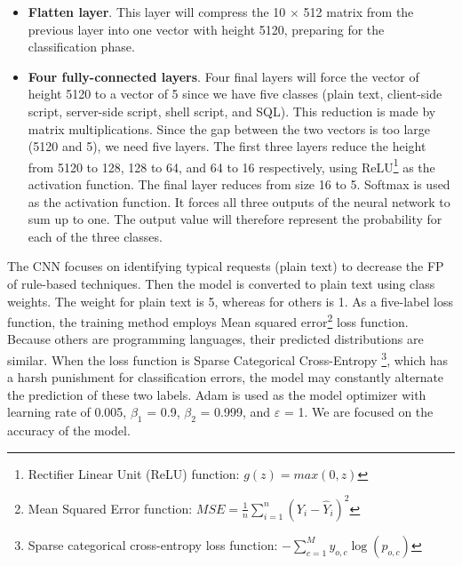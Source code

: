 \begin{itemize}
	\item \textbf{Flatten layer}. This layer will compress the 10 $\times$ 512 matrix from the previous layer into one vector with height 5120, preparing for the classification phase. 
	\item \textbf{Four fully-connected layers}. Four final layers will force the vector of height 5120 to a vector of 5 since we have five classes (plain text, client-side script, server-side script, shell script, and SQL). This reduction is made by matrix multiplications. Since the gap between the two vectors is too large (5120 and 5), we need five layers. The first three layers reduce the height from 5120 to 128, 128 to 64, and 64 to 16 respectively, using ReLU\footnote{
		Rectifier Linear Unit (ReLU) function: $g(z) = max(0, z)$
	} as the activation function. The final layer reduces from size 16 to 5. Softmax is used as the activation function. It forces all three outputs of the neural network to sum up to one. The output value will therefore represent the probability for each of the three classes.
\end{itemize}
\newpage
\hspace{0.5cm}The CNN focuses on identifying typical requests (plain text) to decrease the FP of rule-based techniques. Then the model is converted to plain text using class weights. The weight for plain text is 5, whereas for others is 1. As a five-label loss function, the training method employs Mean squared error\footnote{
	Mean Squared Error function: $MSE = \frac{1}{n}\sum_{i=1}^{n}(Y_i-\widehat{Y}_i)^2$
} loss function. Because others are programming languages, their predicted distributions are similar. When the loss function is Sparse Categorical Cross-Entropy\hspace{-0.15cm}
\footnote{
	Sparse categorical cross-entropy loss function: $-\sum_{c=1}^My_{o,c}\log(p_{o,c})$
}, which has a harsh punishment for classification errors, the model may constantly alternate the prediction of these two labels. Adam is used as the model optimizer with learning rate of 0.005, $\beta_1$ = 0.9, $\beta_2$ = 0.999, and $\varepsilon$ = 1. We are focused on the accuracy of the model.

